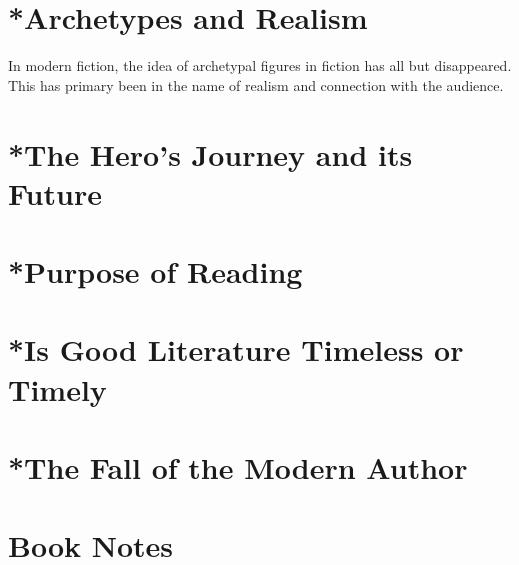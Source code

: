 \section{*Archetypes and Realism}
\par In modern fiction, the idea of archetypal figures in fiction has all but disappeared. This has primary been in the name of realism and connection with the audience.
\section{*The Hero's Journey and its Future}
\section{*Purpose of Reading}
\section{*Is Good Literature Timeless or Timely}
\section{*The Fall of the Modern Author}
\section{Book Notes}

